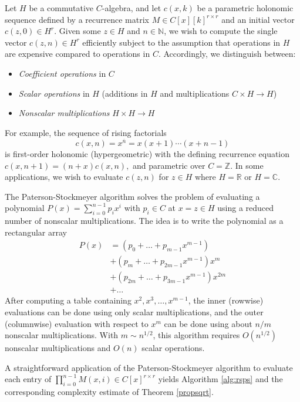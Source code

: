 \documentclass{sig-alternate}
\begin{document}
Let $H$ be a commutative $C$-algebra, and let $c(x,k)$ be a
parametric holonomic sequence defined by a recurrence matrix
$M \in C[x][k]^{r\times r}$ and an initial vector
$c(z,0) \in H^r$.
Given some $z \in H$ and $n \in \mathbb{N}$, we wish to compute
the single vector $c(z,n) \in H^r$ efficiently subject to
the assumption that operations in $H$ are expensive
compared to operations in $C$. Accordingly, we distinguish between:
\begin{itemize}
\item \emph{Coefficient operations} in $C$
\item \emph{Scalar operations} in $H$ (additions in $H$ and multiplications $C \times H \to H$)
\item \emph{Nonscalar multiplications} $H \times H \to H$
\end{itemize}

For example, the sequence of rising factorials
$$c(x,n) = x^{\overline{n}} = x (x+1) \cdots (x+n-1)$$
is first-order holonomic (hypergeometric) with
the defining recurrence equation
$c(x,n+1) = (n+x) c(x,n),$
and parametric over $C = \mathbb{Z}$. In some applications,
we wish to evaluate $c(z,n)$ for $z \in H$ where
$H = \mathbb{R}$ or $H = \mathbb{C}$.

The Paterson-Stockmeyer algorithm \cite{PatersonStockmeyer1973}
solves the problem of evaluating a polynomial
$P(x) = \sum_{i=0}^{n-1} p_i x^i$ with $p_i \in C$
at $x = z \in H$ using a reduced
number of nonscalar multiplications. The idea is to write
the polynomial as a rectangular array
\begin{equation}
\begin{aligned}
P(x) & = (p_0 + \ldots + p_{m-1} x^{m-1}) \\
     & + (p_m + \ldots + p_{2m-1} x^{m-1}) x^m \\
     & + (p_{2m} + \ldots + p_{3m-1} x^{m-1}) x^{2m} \\
     & + \ldots
\end{aligned}
\label{eq:ps}
\end{equation}
After computing a table containing $x^2, x^3, \ldots, x^{m-1}$, the
inner (rowwise) evaluations can be done using only scalar multiplications,
and the outer (columnwise) evaluation with respect to $x^m$
can be done using about $n/m$ nonscalar multiplications.
With $m \sim n^{1/2}$, this algorithm requires $O(n^{1/2})$ nonscalar
multiplications and $O(n)$ scalar operations.

A straightforward application of the Paterson-Stockmeyer
algorithm to evaluate each entry of $\prod_{i=0}^{n-1} M(x,i) \in C[x]^{r \times r}$
yields Algorithm \ref{alg:rsps}
and the corresponding complexity estimate of Theorem \ref{propsqrt}.
\end{document}
